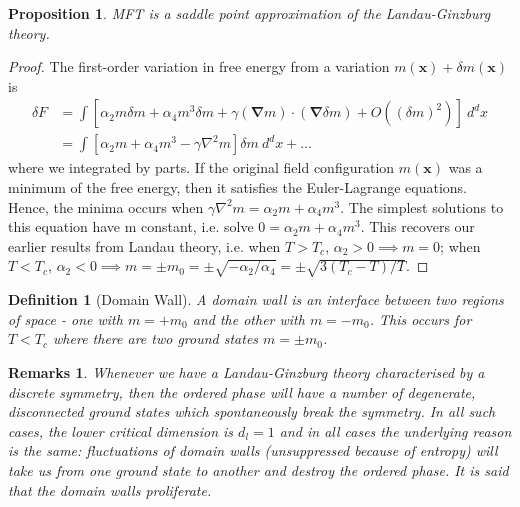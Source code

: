 \documentclass[a4paper]{article}
\newtheorem{remarks}{Remarks}[section]
\theoremstyle{new}
\newtheorem{defi}{Definition}[section]
\newtheorem{prop}{Proposition}[section]
\begin{document}
\begin{prop}
MFT is a saddle point approximation of the Landau-Ginzburg theory.
\end{prop}
\begin{proof}
The first-order variation in free energy from a variation $m(\mathbf{x})+\delta m(\mathbf{x})$ is
\begin{align}
    \delta F&=\int[\alpha_2m\delta m+\alpha_4m^3\delta m+\gamma(\boldsymbol{\nabla}m)\cdot(\boldsymbol{\nabla}\delta m)+O((\delta m)^2)]~d^dx\nonumber\\&=\int[\alpha_2m+\alpha_4m^3-\gamma\nabla^2m]\delta m~d^dx+\dots\nonumber
\end{align}
where we integrated by parts. If the original field configuration $m(\mathbf{x})$ was a minimum of the free energy, then it satisfies the Euler-Lagrange equations. Hence, the minima occurs when $\gamma\nabla^2m=\alpha_2m+\alpha_4m^3$. The simplest solutions to this equation have m constant, i.e. solve $0=\alpha_2m+\alpha_4m^3$. This recovers our earlier results from Landau theory, i.e. when $T>T_c$, $\alpha_2>0\implies m=0$; when $T<T_c$, $\alpha_2<0\implies m=\pm m_0=\pm\sqrt{-\alpha_2/\alpha_4}=\pm\sqrt{3(T_c-T)/T}$.
\end{proof}
\begin{defi}[Domain Wall]
A domain wall is an interface between two regions of space - one with $m=+m_0$ and the other with $m=-m_0$. This occurs for $T<T_c$ where there are two ground states $m=\pm m_0$. 
\end{defi}
\begin{remarks}
Whenever we have a Landau-Ginzburg theory characterised by a discrete symmetry, then the ordered phase will have a number of degenerate, disconnected ground states which spontaneously break the symmetry. In all such cases, the lower critical dimension is $d_l = 1$ and in all cases the underlying reason is the same: fluctuations of domain walls (unsuppressed because of entropy) will take us from one ground state to another and destroy the ordered phase. It is said that the domain walls proliferate.
\end{remarks}
\end{document}

